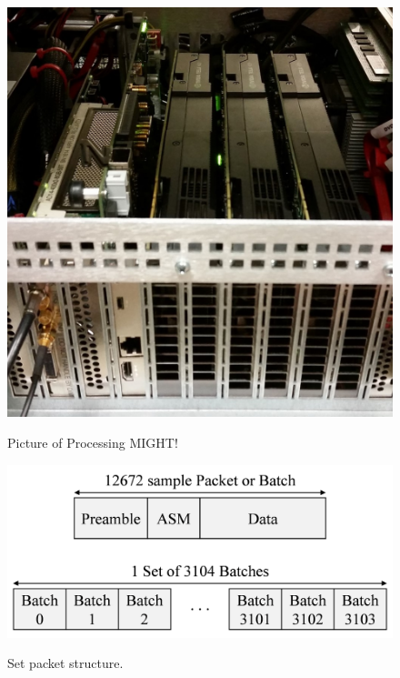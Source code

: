 \begin{figure}
	\centering\includegraphics[scale=1]{figures/systemOverview/HostSystem.jpg}
	\label{fig:HostSystem}
	\caption{Picture of Processing MIGHT!}
\end{figure}
\begin{figure}
	\centering\includegraphics[width=5.94in/100*55]{figures/eq_GPUimplementation/packet_batch_set.pdf}
	\label{fig:packet_batch_set}
	\caption{Set packet structure.}
\end{figure}


